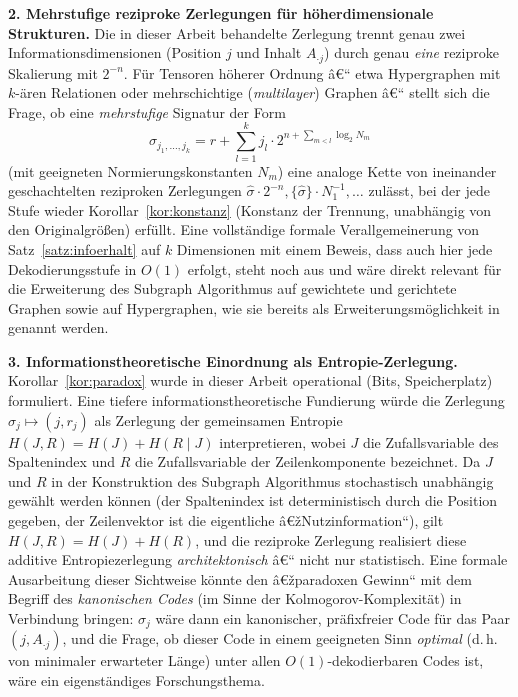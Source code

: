 ﻿\documentclass[a4paper,12pt]{article}
\theoremstyle{definition}
\begin{document}
\textbf{2. Mehrstufige reziproke Zerlegungen für höherdimensionale
Strukturen.} Die in dieser Arbeit behandelte Zerlegung trennt genau zwei
Informationsdimensionen (Position $j$ und Inhalt $A_{\cdot j}$) durch genau
\emph{eine} reziproke Skalierung mit $2^{-n}$. Für Tensoren höherer Ordnung
â€“ etwa Hypergraphen mit $k$-ären Relationen oder mehrschichtige
(\emph{multilayer}) Graphen â€“ stellt sich die Frage, ob eine
\emph{mehrstufige} Signatur der Form
\[
	\sigma_{j_1,\ldots,j_k} = r + \sum_{l=1}^{k} j_l \cdot 2^{n + \sum_{m<l} \log_2 N_m}
\]
(mit geeigneten Normierungskonstanten $N_m$) eine analoge Kette von
ineinander geschachtelten reziproken Zerlegungen
$\hat\sigma \cdot 2^{-n}, \{\hat\sigma\}\cdot N_1^{-1}, \ldots$ zulässt, bei
der jede Stufe wieder Korollar~\ref{kor:konstanz} (Konstanz der Trennung,
unabhängig von den Originalgrößen) erfüllt. Eine vollständige formale
Verallgemeinerung von Satz~\ref{satz:infoerhalt} auf $k$ Dimensionen mit
einem Beweis, dass auch hier jede Dekodierungsstufe in $O(1)$ erfolgt, steht
noch aus und wäre direkt relevant für die Erweiterung des Subgraph
Algorithmus auf gewichtete und gerichtete Graphen sowie auf Hypergraphen,
wie sie bereits als Erweiterungsmöglichkeit in \cite{epp2026subgraph}
genannt werden.

\textbf{3. Informationstheoretische Einordnung als Entropie-Zerlegung.}
Korollar~\ref{kor:paradox} wurde in dieser Arbeit operational (Bits,
Speicherplatz) formuliert. Eine tiefere informationstheoretische Fundierung
würde die Zerlegung $\sigma_j \mapsto (j, r_j)$ als Zerlegung der
gemeinsamen Entropie $H(J, R) = H(J) + H(R\mid J)$ interpretieren, wobei $J$
die Zufallsvariable des Spaltenindex und $R$ die Zufallsvariable der
Zeilenkomponente bezeichnet. Da $J$ und $R$ in der Konstruktion des
Subgraph Algorithmus stochastisch unabhängig gewählt werden können (der
Spaltenindex ist deterministisch durch die Position gegeben, der
Zeilenvektor ist die eigentliche â€žNutzinformation``), gilt
$H(J,R) = H(J) + H(R)$, und die reziproke Zerlegung realisiert diese additive
Entropiezerlegung \emph{architektonisch} â€“ nicht nur statistisch. Eine
formale Ausarbeitung dieser Sichtweise könnte den â€žparadoxen Gewinn`` mit dem
Begriff des \emph{kanonischen Codes} (im Sinne der Kolmogorov-Komplexität)
in Verbindung bringen: $\sigma_j$ wäre dann ein kanonischer, präfixfreier
Code für das Paar $(j, A_{\cdot j})$, und die Frage, ob dieser Code in einem
geeigneten Sinn \emph{optimal} (d.\,h. von minimaler erwarteter Länge) unter
allen $O(1)$-dekodierbaren Codes ist, wäre ein eigenständiges
Forschungsthema.
\end{document}
